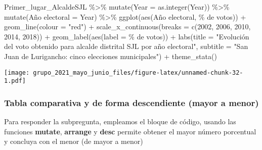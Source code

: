 \documentclass[
]{book}
\newenvironment{Shaded}{\begin{snugshade}}{\end{snugshade}}
\newcommand{\AttributeTok}[1]{\textcolor[rgb]{0.77,0.63,0.00}{#1}}
\newcommand{\DecValTok}[1]{\textcolor[rgb]{0.00,0.00,0.81}{#1}}
\newcommand{\FunctionTok}[1]{\textcolor[rgb]{0.00,0.00,0.00}{#1}}
\newcommand{\NormalTok}[1]{#1}
\newcommand{\OtherTok}[1]{\textcolor[rgb]{0.56,0.35,0.01}{#1}}
\newcommand{\SpecialCharTok}[1]{\textcolor[rgb]{0.00,0.00,0.00}{#1}}
\newcommand{\StringTok}[1]{\textcolor[rgb]{0.31,0.60,0.02}{#1}}
\begin{document}
\begin{Shaded}
\begin{Highlighting}[]
\NormalTok{Primer\_lugar\_AlcaldeSJL }\SpecialCharTok{\%\textgreater{}\%} 
  \FunctionTok{mutate}\NormalTok{(}\AttributeTok{Year =} \FunctionTok{as.integer}\NormalTok{(Year)) }\SpecialCharTok{\%\textgreater{}\%}
  \FunctionTok{mutate}\NormalTok{(}\StringTok{\textasciigrave{}}\AttributeTok{Año electoral}\StringTok{\textasciigrave{}} \OtherTok{=}\NormalTok{ Year) }\SpecialCharTok{\%\textgreater{}\%}
  \FunctionTok{ggplot}\NormalTok{(}\FunctionTok{aes}\NormalTok{(}\StringTok{\textasciigrave{}}\AttributeTok{Año electoral}\StringTok{\textasciigrave{}}\NormalTok{, }\StringTok{\textasciigrave{}}\AttributeTok{\% de votos}\StringTok{\textasciigrave{}}\NormalTok{)) }\SpecialCharTok{+} 
  \FunctionTok{geom\_line}\NormalTok{(}\AttributeTok{colour =} \StringTok{"red"}\NormalTok{) }\SpecialCharTok{+} 
  \FunctionTok{scale\_x\_continuous}\NormalTok{(}\AttributeTok{breaks =} \FunctionTok{c}\NormalTok{(}\DecValTok{2002}\NormalTok{, }\DecValTok{2006}\NormalTok{, }\DecValTok{2010}\NormalTok{, }\DecValTok{2014}\NormalTok{, }\DecValTok{2018}\NormalTok{)) }\SpecialCharTok{+}
  \FunctionTok{geom\_label}\NormalTok{(}\FunctionTok{aes}\NormalTok{(}\AttributeTok{label =} \StringTok{\textasciigrave{}}\AttributeTok{\% de votos}\StringTok{\textasciigrave{}}\NormalTok{)) }\SpecialCharTok{+}
  \FunctionTok{labs}\NormalTok{(}\AttributeTok{title =} \StringTok{"Evolución del voto obtenido para alcalde distrital SJL por año electoral"}\NormalTok{,}
       \AttributeTok{subtitle =} \StringTok{"San Juan de Lurigancho: cinco elecciones municipales"}\NormalTok{) }\SpecialCharTok{+}
  \FunctionTok{theme\_stata}\NormalTok{()}
\end{Highlighting}
\end{Shaded}

\texttt{[image: grupo\_2021\_mayo\_junio\_files/figure-latex/unnamed-chunk-32-1.pdf]}

\hypertarget{tabla-comparativa-y-de-forma-descendiente-mayor-a-menor}{%
\subsubsection{Tabla comparativa y de forma descendiente (mayor a menor)}\label{tabla-comparativa-y-de-forma-descendiente-mayor-a-menor}}

Para responder la subpregunta, empleamos el bloque de código, usando las funciones \textbf{mutate}, \textbf{arrange} y \textbf{desc} permite obtener el mayor número porcentual y concluya con el menor (de mayor a menor)
\end{document}
